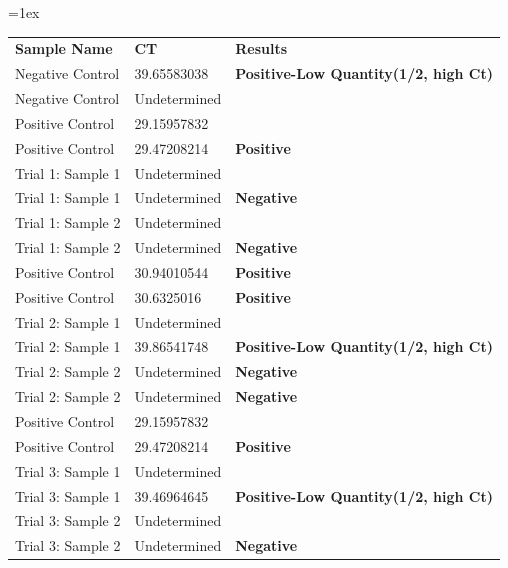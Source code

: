 \documentclass[11pt, letterpaper]{article}
\begin{document}
\begin{table}[H]
\vskip 0.2cm
\begin{center}
\tabulinesep=1ex
\begin{tabu} to \linewidth {|X|X|X[2,l]|}
	\hline  
	\textbf{Sample Name} & \textbf{CT} & \textbf{Results}
  	\\
  	\Xhline{4\arrayrulewidth} 
  	Negative Control & 39.65583038 & \textbf{Positive-Low Quantity(1/2, high Ct)}
  	\\
  	\hline 
  	Negative Control & Undetermined &
  	\\ 
	\hline 
  	Positive Control & 29.15957832 &
  	\\ 
  	\hline 
  	Positive Control & 29.47208214 & \textbf{Positive}
  	\\ 
	\hline 
  	Trial 1: Sample 1 & Undetermined & \textbf{}
  	\\ 
	\hline 
  	Trial 1: Sample 1 & Undetermined & \textbf{Negative}
  	\\ \hline 
  	Trial 1: Sample 2 & Undetermined & \textbf{}
  	\\ \hline 
  	Trial 1: Sample 2 & Undetermined & \textbf{Negative}
  	\\ 
  	\Xhline{4\arrayrulewidth} 
  	Positive Control & 30.94010544 & \textbf{Positive}
  	\\ 
  	\hline 
  	Positive Control & 30.6325016 & \textbf{Positive}
  	\\ 
	\hline 
  	Trial 2: Sample 1 & Undetermined & \textbf{}
  	\\ 
	\hline 
  	Trial 2: Sample 1 & 39.86541748 & \textbf{Positive-Low Quantity(1/2, high Ct)}
  	\\ 
  	\hline 
  	Trial 2: Sample 2 & Undetermined & \textbf{Negative}
  	\\ 
  	\hline 
  	Trial 2: Sample 2 & Undetermined & \textbf{Negative}
  	\\ 
  	\Xhline{4\arrayrulewidth}
  	Positive Control & 29.15957832 &
  	\\ 
  	\hline 
  	Positive Control & 29.47208214 & \textbf{Positive}
  	\\ 
	\hline 
  	Trial 3: Sample 1 & Undetermined & \textbf{}
  	\\ 
	\hline 
  	Trial 3: Sample 1 & 39.46964645 & \textbf{Positive-Low Quantity(1/2, high Ct)}
  	\\ 
  	\hline 
  	Trial 3: Sample 2 & Undetermined & \textbf{}
  	\\ 
  	\hline 
  	Trial 3: Sample 2 & Undetermined & \textbf{Negative}
  	\\ 

\end{tabu}
\end{center}
\end{table}
\end{document}

